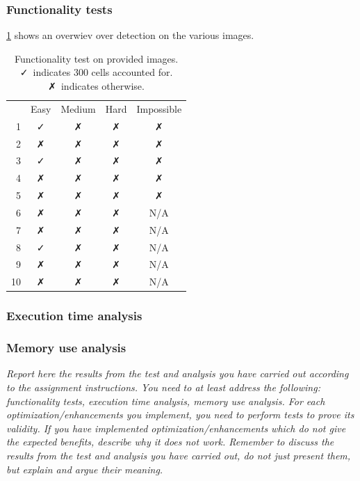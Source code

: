 \documentclass[a4paper, english]{article}
\numberwithin{equation}{section}
\begin{document}
\subsubsection{Functionality tests}
\cref{tbl:pocfunc} shows an overwiev over detection on the various images.
\begin{table}
    \centering
    \caption{Functionality test on provided images. \faCheck \ indicates 300 cells accounted for. \faClose \ indicates otherwise.}\label{tbl:pocfunc}
    \begin{tabular}{rcccc}
           & Easy     & Medium   & Hard     & Impossible \\
        1  & \faCheck & \faClose & \faClose & \faClose   \\
        2  & \faClose & \faClose & \faClose & \faClose   \\
        3  & \faCheck & \faClose & \faClose & \faClose   \\
        4  & \faClose & \faClose & \faClose & \faClose   \\
        5  & \faClose & \faClose & \faClose & \faClose   \\
        6  & \faClose & \faClose & \faClose & N/A        \\
        7  & \faClose & \faClose & \faClose & N/A        \\
        8  & \faCheck & \faClose & \faClose & N/A        \\
        9  & \faClose & \faClose & \faClose & N/A        \\
        10 & \faClose & \faClose & \faClose & N/A        \\
    \end{tabular}
\end{table}
\subsubsection{Execution time analysis}
\subsubsection{Memory use analysis}
\textit{Report here the results from the test and analysis you have carried out according to the assignment instructions.  You need to at least address the following: functionality tests, execution time analysis, memory use analysis.
    For each optimization/enhancements you implement, you need to perform tests to prove its validity. If you have implemented optimization/enhancements which do not give the expected benefits, describe why it does not work.
    Remember to discuss the results from the test and analysis you have carried out, do not just present them, but explain and argue their meaning.}
\end{document}
